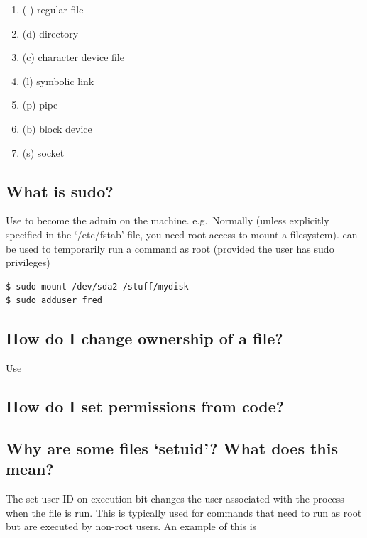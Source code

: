 \begin{enumerate}
\item (-) regular file 
\item (d) directory 
\item (c) character device file 
\item (l) symbolic link 
\item (p) pipe 
\item (b) block device 
\item (s) socket
\end{enumerate}

\subsection{What is sudo?}\label{what-is-sudo}

Use  to become the admin on the machine. e.g.~Normally (unless explicitly specified in the `/etc/fstab' file, you need root access to mount a filesystem).  can be used to temporarily run a command as root (provided the user has sudo privileges)

\begin{lstlisting}
$ sudo mount /dev/sda2 /stuff/mydisk
$ sudo adduser fred
\end{lstlisting}

\subsection{How do I change ownership of a file?}\label{how-do-i-change-ownership-of-a-file}

Use 

\subsection{How do I set permissions from code?}\label{how-do-i-set-permissions-from-code}


\subsection{\texorpdfstring{Why are some files `setuid'? What does this mean?}{Why are some files setuid? What does this mean?}}\label{why-are-some-files-setuid-what-does-this-mean}

The set-user-ID-on-execution bit changes the user associated with the process when the file is run. This is typically used for commands that need to run as root but are executed by non-root users. An example of this is 

